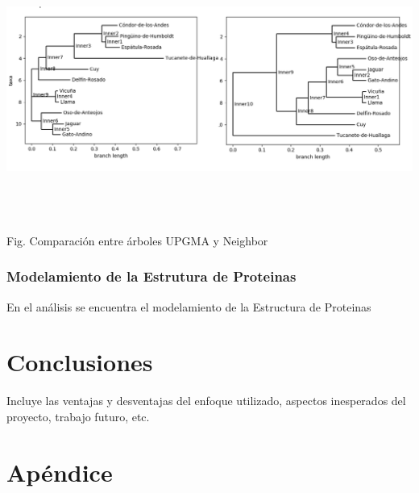 \documentclass[a4paper]{article}
\begin{document}
\begin{center}
	\includegraphics[width=15.5cm,height=8.5cm]{tree_comparation.png}
	
	Fig. Comparación entre árboles UPGMA y Neighbor
\end{center}




\subsubsection{Modelamiento de la Estrutura de Proteinas}
En el análisis se encuentra el modelamiento de la Estructura de Proteinas

\section{Conclusiones}
Incluye las ventajas y desventajas del enfoque utilizado, aspectos inesperados del proyecto, trabajo futuro, etc.
\section{Apéndice}
\end{document}
